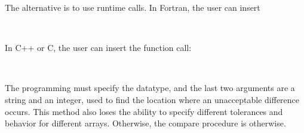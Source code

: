 The alternative is to use runtime calls.
In Fortran, the user can insert
\begin{otabbing}
\> \\
\>
\end{otabbing}
In C++ or C, the user can insert the function call:
\begin{otabbing}
\> \\
\>
\end{otabbing}
The programming must specify the datatype, and the last two arguments are a string and an integer, used to find the location where an unacceptable difference occurs.
This method also loses the ability to specify different tolerances and behavior for different arrays.
Otherwise, the compare procedure is otherwise.

